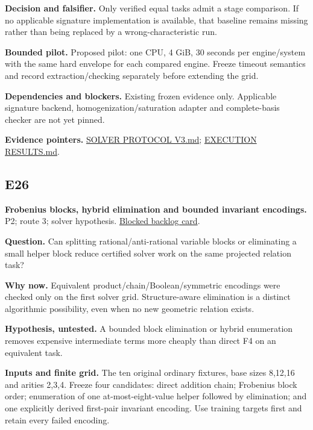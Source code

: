 \documentclass[
  10pt,
]{article}
\begin{document}
\textbf{Decision and falsifier.} Only verified equal tasks admit a stage
comparison. If no applicable signature implementation is available, that
baseline remains missing rather than being replaced by a
wrong-characteristic run.

\textbf{Bounded pilot.} Proposed pilot: one CPU, 4 GiB, 30 seconds per
engine/system with the same hard envelope for each compared engine.
Freeze timeout semantics and record extraction/checking separately
before extending the grid.

\textbf{Dependencies and blockers.} Existing frozen evidence only.
Applicable signature backend, homogenization/saturation adapter and
complete-basis checker are not yet pinned.

\textbf{Evidence pointers.}
\href{../../../research/twist_routes_1_3_20261021/SOLVER_PROTOCOL_V3.md}{SOLVER
PROTOCOL V3.md};
\href{../../../research/twist_routes_1_3_20261021/reports/EXECUTION_RESULTS.md}{EXECUTION
RESULTS.md}.

\subsection{E26}\label{e26}

\textbf{Frobenius blocks, hybrid elimination and bounded invariant
encodings.} P2; route 3; solver hypothesis.
\href{../../../backlog/XP-20261022-twist-block-elimination/README.md}{Blocked
backlog card}.

\textbf{Question.} Can splitting rational/anti-rational variable blocks
or eliminating a small helper block reduce certified solver work on the
same projected relation task?

\textbf{Why now.} Equivalent product/chain/Boolean/symmetric encodings
were checked only on the first solver grid. Structure-aware elimination
is a distinct algorithmic possibility, even when no new geometric
relation exists.

\textbf{Hypothesis, untested.} A bounded block elimination or hybrid
enumeration removes expensive intermediate terms more cheaply than
direct F4 on an equivalent task.

\textbf{Inputs and finite grid.} The ten original ordinary fixtures,
base sizes 8,12,16 and arities 2,3,4. Freeze four candidates: direct
addition chain; Frobenius block order; enumeration of one
at-most-eight-value helper followed by elimination; and one explicitly
derived first-pair invariant encoding. Use training targets first and
retain every failed encoding.
\end{document}
